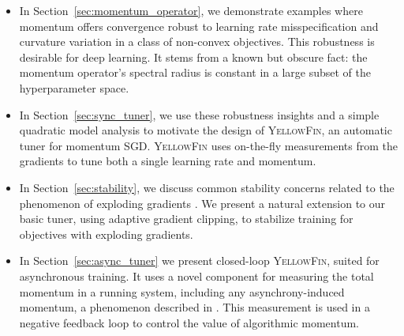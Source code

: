 \documentclass{article} %
\newcommand{\tuner}{\textsc{YellowFin}\xspace}
\newcommand{\asynctuner}{closed-loop \textsc{YellowFin}\xspace}
\begin{document}
\begin{itemize}[leftmargin=2em]
\setlength\itemsep{0.2em}
\item
In Section~\ref{sec:momentum_operator}, we demonstrate examples where momentum offers convergence robust to learning rate misspecification and curvature variation in a class of non-convex objectives.
This robustness is desirable for deep learning.
It stems from a known but obscure fact:
the momentum operator's spectral radius is constant in a large subset of the hyperparameter space.
\vspace{-1em}
\item
In Section~\ref{sec:sync_tuner}, we use these robustness insights and a simple quadratic model analysis to motivate the design of \tuner, an automatic tuner for momentum SGD.
\tuner uses on-the-fly measurements from the gradients to tune both a single learning rate and momentum.
\item In Section~\ref{sec:stability}, we discuss common stability concerns related to the phenomenon of exploding gradients \citep{pascanu2013difficulty}.
We present a natural extension to our basic tuner, using adaptive gradient clipping, to stabilize training for objectives with exploding gradients.
\item In Section~\ref{sec:async_tuner} we present \asynctuner, suited for asynchronous training.
It uses a novel component for  measuring the total momentum in a running system, including any asynchrony-induced momentum, a phenomenon described in \cite{mitliagkas2016asynchrony}.
This measurement is used in a negative feedback loop to control the value of algorithmic momentum.%

\end{itemize}
\end{document}
